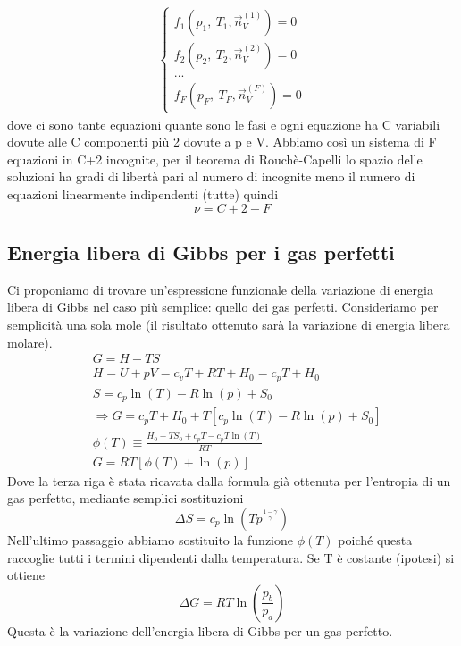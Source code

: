 \documentclass[
10pt, %
a4paper, %
oneside, %
headinclude,footinclude, %
BCOR5mm, %
]{scrartcl}
\begin{document}
\begin{align*}
	\begin{cases}
		f_1(p_1,\ T_1, \vec{n}_V^{(1)})=0\\
		f_2(p_2,\ T_2, \vec{n}_V^{(2)})=0\\
		...\\
		f_F(p_F,\ T_F, \vec{n}_V^{(F)})=0
	\end{cases}
\end{align*}
dove ci sono tante equazioni quante sono le fasi e ogni equazione ha C variabili dovute alle C componenti più 2 dovute a p e V. Abbiamo così un sistema di F equazioni in C+2 incognite, per il teorema di Rouchè-Capelli lo spazio delle soluzioni ha gradi di libertà pari al numero di incognite meno il numero di equazioni linearmente indipendenti (tutte) quindi
\[\nu = C+2-F\]
\subsection{Energia libera di Gibbs per i gas perfetti}
Ci proponiamo di trovare un'espressione funzionale della variazione di energia libera di Gibbs nel caso più semplice: quello dei gas perfetti. Consideriamo per semplicità una sola mole (il risultato ottenuto sarà la variazione di energia libera molare).
\begin{align*}
	&G = H-TS\\
	&H=U+pV=c_v T + RT + H_0 = c_p T +H_0\\
	&S=c_p\ln(T)-R\ln(p)+S_0\\
	&\Rightarrow G = c_p T+H_0+T[c_p\ln(T)-R\ln(p)+S_0]\\
	&\phi(T) \equiv \frac{H_0-TS_0+c_pT-c_pT\ln(T)}{RT}\\
	&G=RT[\phi(T)+\ln(p)]
\end{align*} 
Dove la terza riga è stata ricavata dalla formula già ottenuta per l'entropia di un gas perfetto, mediante semplici sostituzioni
\[\Delta S = c_p\ln(Tp^{\frac{1-\gamma}{\gamma}})\]
Nell'ultimo passaggio abbiamo sostituito la funzione $\phi(T)$ poiché questa raccoglie tutti i termini dipendenti dalla temperatura. Se T è costante (ipotesi) si ottiene
\[\Delta G = RT\ln\left(\frac{p_b}{p_a}\right)\]
Questa è la variazione dell'energia libera di Gibbs per un gas perfetto.\\
\end{document}
